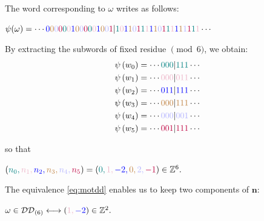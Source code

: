 \documentclass[11pt,letterpaper]{amsart}
\def\bbbz{\mathbb Z}
\def\ccdd{\mathcal {DD}}
\numberwithin{equation}{section}
\numberwithin{df}{section}
\begin{document}
The word corresponding to $\omega$ writes as follows:
\begin{center}
$\psi(\omega)=\cdots \color{blue}{0} \color{brown}{0}  \color{blue!30}{0} \color{purple}{0} \color{teal}{0} \color{purple!30}{0}\color{blue}{1} \color{brown}{0}  \color{blue!30}{0} \color{purple}{0} \color{teal}{0} \color{purple!30}{0} \color{blue}{1} \color{brown}{0}  \color{blue!30}{0} \color{purple}{1} \color{black}|\color{teal}{1} \color{purple!30}{0} \color{blue}{1} \color{brown}{1}  \color{blue!30}{0} \color{purple}{1} \color{teal}{1} \color{purple!30}{1} \color{blue}{1} \color{brown}{1}  \color{blue!30}{0} \color{purple}{1} \color{teal}{1} \color{purple!30}{1}
\color{blue}{1} \color{brown}{1}  \color{blue!30}{1} \color{purple}{1} \color{teal}{1} \color{purple!30}{1}\color{black}\cdots $
\end{center}


By extracting the subwords of fixed residue $\pmod 6$, we obtain:
\begin{align*}
\psi\left(w_{0}\right)=\cdots \color{teal} 000 \color{black}| \color{teal}111\color{black}\cdots\\
\psi\left(w_{1}\right)=\cdots \color{purple!30} 000 \color{black}| \color{purple!30}011\color{black}\cdots\\
\psi\left(w_{2}\right)=\cdots \color{blue} 011 \color{black}| \color{blue}111\color{black}\cdots\\
\psi\left(w_{3}\right)=\cdots \color{brown} 000 \color{black}| \color{brown}111\color{black}\cdots\\
\psi\left(w_{4}\right)=\cdots \color{blue!30} 000 \color{black}| \color{blue!30}001\color{black}\cdots\\
\psi\left(w_{5}\right)=\cdots \color{purple} 001 \color{black}| \color{purple}111\color{black}\cdots
\end{align*}

so that
\begin{center}
$(\color{teal}{n_0},\color{purple!30}{n_1},\color{blue}{n_2},\color{brown}{n_3},\color{blue!30}{n_4},\color{purple}{n_5}\textcolor{black}{)=(}\color{teal}{0},\color{purple!30}{1},\color{blue}{-2},\color{brown}{0},\color{blue!30}{2},\color{purple}{-1} \textcolor{black}{)\in\bbbz^6.}$
\end{center}
The equivalence \eqref{eq:motdd} enables us to keep two components of $\mathbf{n}$:
\begin{center}
$ \omega \in\ccdd_{(6)}\longleftrightarrow (\color{purple!30}{1},\color{blue}{-2}\textcolor{black}{)\in\bbbz^2.}$
\end{center}
%
\end{document}
